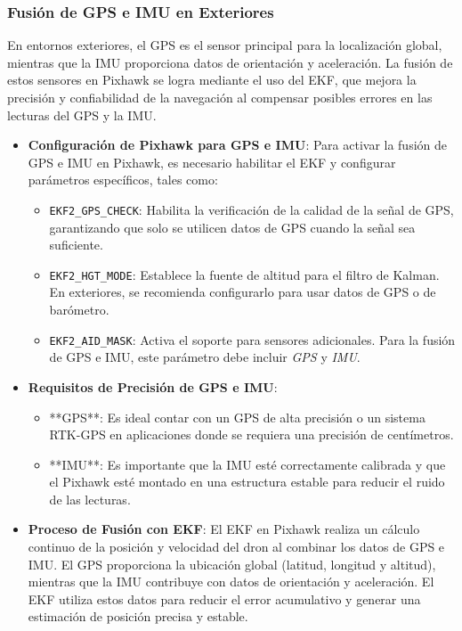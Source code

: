     \subsubsection{Fusión de GPS e IMU en Exteriores}
    En entornos exteriores, el GPS es el sensor principal para la localización global, mientras que la IMU proporciona datos de orientación y aceleración. La fusión de estos sensores en Pixhawk se logra mediante el uso del EKF, que mejora la precisión y confiabilidad de la navegación al compensar posibles errores en las lecturas del GPS y la IMU.
    
    \begin{itemize}
        \item \textbf{Configuración de Pixhawk para GPS e IMU}: Para activar la fusión de GPS e IMU en Pixhawk, es necesario habilitar el EKF y configurar parámetros específicos, tales como:
            \begin{itemize}
                \item \texttt{EKF2\_GPS\_CHECK}: Habilita la verificación de la calidad de la señal de GPS, garantizando que solo se utilicen datos de GPS cuando la señal sea suficiente.
                \item \texttt{EKF2\_HGT\_MODE}: Establece la fuente de altitud para el filtro de Kalman. En exteriores, se recomienda configurarlo para usar datos de GPS o de barómetro.
                \item \texttt{EKF2\_AID\_MASK}: Activa el soporte para sensores adicionales. Para la fusión de GPS e IMU, este parámetro debe incluir \textit{GPS} y \textit{IMU}.
            \end{itemize}
            
        \item \textbf{Requisitos de Precisión de GPS e IMU}: 
            \begin{itemize}
                \item **GPS**: Es ideal contar con un GPS de alta precisión o un sistema RTK-GPS en aplicaciones donde se requiera una precisión de centímetros.
                \item **IMU**: Es importante que la IMU esté correctamente calibrada y que el Pixhawk esté montado en una estructura estable para reducir el ruido de las lecturas.
            \end{itemize}
            
        \item \textbf{Proceso de Fusión con EKF}: 
            El EKF en Pixhawk realiza un cálculo continuo de la posición y velocidad del dron al combinar los datos de GPS e IMU. El GPS proporciona la ubicación global (latitud, longitud y altitud), mientras que la IMU contribuye con datos de orientación y aceleración. El EKF utiliza estos datos para reducir el error acumulativo y generar una estimación de posición precisa y estable.
    \end{itemize}
    
